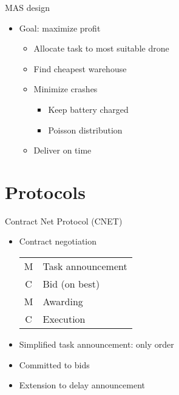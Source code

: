 \documentclass{beamer}
\begin{document}
	\begin{frame}{MAS design}
		\begin{itemize}
			\item Goal: maximize profit
			\begin{itemize}
				\item Allocate task to most suitable drone
				\item Find cheapest warehouse
				\item Minimize crashes
				\begin{itemize}
					\item Keep battery charged
					\item Poisson distribution
				\end{itemize}
				\item Deliver on time
			\end{itemize}
		\end{itemize}
	\end{frame}
	
	\section{Protocols}
		
	\begin{frame}{Contract Net Protocol (CNET)}
		\begin{itemize}
			\item Contract negotiation
			\linebreak			\begin{tabular}{cl}
				M & Task announcement \\
				C & Bid (on best) \\
				M & Awarding \\
				C & Execution \\
			\end{tabular}
		\end{itemize}
		
		
		\begin{itemize}			\item Simplified task announcement: only order
			\item Committed to bids
			\item Extension to delay announcement
		\end{itemize}
	\end{frame}
	
\end{document}

